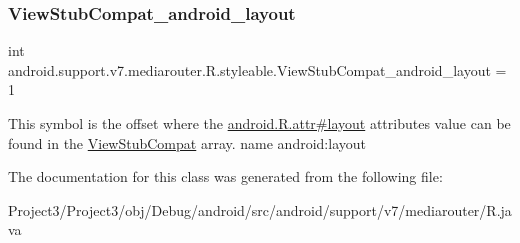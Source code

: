 \subsubsection{\texorpdfstring{View\+Stub\+Compat\+\_\+android\+\_\+layout}{ViewStubCompat\_android\_layout}}
{\footnotesize\ttfamily int android.\+support.\+v7.\+mediarouter.\+R.\+styleable.\+View\+Stub\+Compat\+\_\+android\+\_\+layout = 1\hspace{0.3cm}{\ttfamily [static]}}

This symbol is the offset where the \hyperlink{}{android.\+R.\+attr\#layout} attribute\textquotesingle{}s value can be found in the \hyperlink{classandroid_1_1support_1_1v7_1_1mediarouter_1_1R_1_1styleable_a2fcde22ac0505d305fd8836a3252d763}{View\+Stub\+Compat} array.  name android\+:layout 

The documentation for this class was generated from the following file\+:\begin{DoxyCompactItemize}
\item 
Project3/\+Project3/obj/\+Debug/android/src/android/support/v7/mediarouter/R.\+java\end{DoxyCompactItemize}

